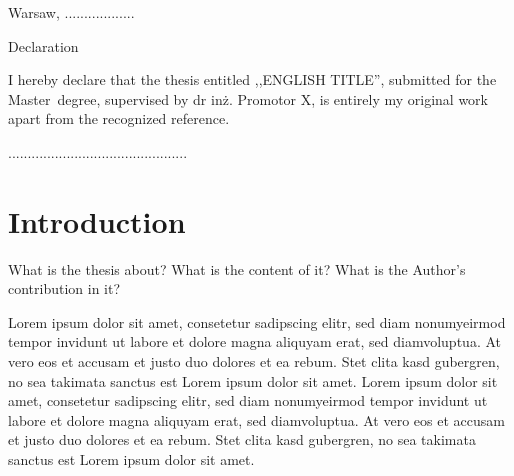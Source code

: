 \documentclass[a4paper,11pt,twoside]{report}
\theoremstyle{definition}
\renewcommand{\title}{ENGLISH TITLE}
\newcommand{\type}{Master} %
\newcommand{\supervisor}{dr inż. Promotor X} %
\begin{document}


\null\thispagestyle{empty}\newpage

\null \hfill Warsaw, ..................\\

\par\vspace{5cm}

\begin{center}
Declaration
\end{center}

I hereby declare that the thesis entitled ,,\title '', submitted for the \type ~degree, supervised  by \supervisor , is entirely my original work apart from the recognized reference.
\vspace{2cm}

\begin{flushright}
  \begin{minipage}{50mm}
    \begin{center}
      ..............................................

    \end{center}
  \end{minipage}
\end{flushright}

\thispagestyle{empty}
\newpage

\null\thispagestyle{empty}\newpage
\tableofcontents
\thispagestyle{empty}
\newpage %



\null\thispagestyle{empty}\newpage
\pagestyle{fancy}
\setcounter{page}{11}


\chapter*{Introduction}

What is the thesis about? What is the content of it? What is the Author's contribution in it?

Lorem ipsum dolor sit amet, consetetur sadipscing elitr, sed diam nonumyeirmod tempor invidunt ut labore et dolore magna aliquyam erat, sed diamvoluptua. At vero eos et accusam et justo duo dolores et ea rebum. Stet clita kasd gubergren, no sea takimata sanctus est Lorem ipsum dolor sit amet. Lorem ipsum dolor sit amet, consetetur sadipscing elitr, sed diam nonumyeirmod tempor invidunt ut labore et dolore magna aliquyam erat, sed diamvoluptua. At vero eos et accusam et justo duo dolores et ea rebum. Stet clita kasd gubergren, no sea takimata sanctus est Lorem ipsum dolor sit amet.
\end{document}
